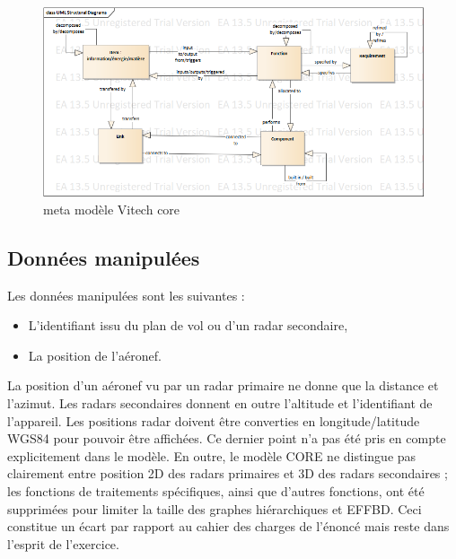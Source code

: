 \begin{figure}[H]
	\begin{center}	
\includegraphics[scale=0.50]{images/meta_modele}
\caption{meta modèle Vitech core}
\label{meta}
	\end{center}
\end{figure}


\subsection{ Données manipulées }

Les données manipulées sont les suivantes :
\begin{itemize}
	\item L'identifiant issu du plan de vol ou d'un radar secondaire,
	\item La position de l'aéronef.
\end{itemize}

La position d'un aéronef vu par un radar primaire ne donne que la distance et l'azimut. Les radars secondaires donnent en outre l'altitude et l'identifiant de l'appareil. Les positions radar doivent être converties en longitude/latitude WGS84 pour pouvoir être affichées. Ce dernier point n'a pas été pris en compte explicitement dans le modèle. En outre, le modèle CORE
ne distingue pas clairement entre position 2D des radars primaires et 3D des radars secondaires ; les fonctions de traitements spécifiques, ainsi que d'autres fonctions, ont été supprimées pour limiter la taille des  graphes hiérarchiques et EFFBD. Ceci constitue un écart par rapport au cahier des charges de l'énoncé mais reste dans l'esprit de l'exercice.
